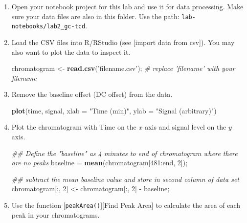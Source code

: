\documentclass[]{tufte-book}
\newenvironment{Shaded}{}{}
\newcommand{\CommentTok}[1]{\textcolor[rgb]{0.38,0.63,0.69}{\textit{#1}}}
\newcommand{\DataTypeTok}[1]{\textcolor[rgb]{0.56,0.13,0.00}{#1}}
\newcommand{\DecValTok}[1]{\textcolor[rgb]{0.25,0.63,0.44}{#1}}
\newcommand{\KeywordTok}[1]{\textcolor[rgb]{0.00,0.44,0.13}{\textbf{#1}}}
\newcommand{\NormalTok}[1]{#1}
\newcommand{\OperatorTok}[1]{\textcolor[rgb]{0.40,0.40,0.40}{#1}}
\newcommand{\StringTok}[1]{\textcolor[rgb]{0.25,0.44,0.63}{#1}}
\begin{document}
\begin{enumerate}
\def\labelenumi{\arabic{enumi}.}
\item
  Open your notebook project for this lab and use it for data processing. Make sure your data files are also in this folder. Use the path: \texttt{lab-notebooks/lab2\_gc-tcd}.
\item
  Load the CSV files into R/RStudio (see {[}import data from csv{]}). You may also want to plot the data to inspect it.

\begin{Shaded}
\begin{Highlighting}[]
\NormalTok{chromatogram <-}\StringTok{ }\KeywordTok{read.csv}\NormalTok{(}\StringTok{'filename.csv'}\NormalTok{);  }\CommentTok{# replace 'filename' with your filename}
\end{Highlighting}
\end{Shaded}
\item
  Remove the baseline offset (DC offset) from the data.

\begin{Shaded}
\begin{Highlighting}[]
\KeywordTok{plot}\NormalTok{(time, signal, }\DataTypeTok{xlab =} \StringTok{"Time (min)"}\NormalTok{, }\DataTypeTok{ylab =} \StringTok{"Signal (arbitrary)"}\NormalTok{)}
\end{Highlighting}
\end{Shaded}
\item
  Plot the chromatogram with Time on the \(x\) axis and signal level on the \(y\) axis.

\begin{Shaded}
\begin{Highlighting}[]
\CommentTok{## Define the "baseline" as 4 minutes to end of chromatogram where there are no peaks}
\NormalTok{baseline =}\StringTok{ }\KeywordTok{mean}\NormalTok{(chromatogram[}\DecValTok{481}\OperatorTok{:}\NormalTok{end, }\DecValTok{2}\NormalTok{]);}

\CommentTok{## subtract the mean baseline value and store in second column of data set}
\NormalTok{chromatogram[}\OperatorTok{:}\NormalTok{, }\DecValTok{2}\NormalTok{] <-}\StringTok{ }\NormalTok{chromatogram[}\OperatorTok{:}\NormalTok{, }\DecValTok{2}\NormalTok{] }\OperatorTok{-}\StringTok{ }\NormalTok{baseline;  }
\end{Highlighting}
\end{Shaded}
\item
  Use the function {[}\texttt{peakArea()}{]}{[}Find Peak Area{]} to calculate the area of each peak in your chromatograms.


\end{enumerate}
\end{document}
